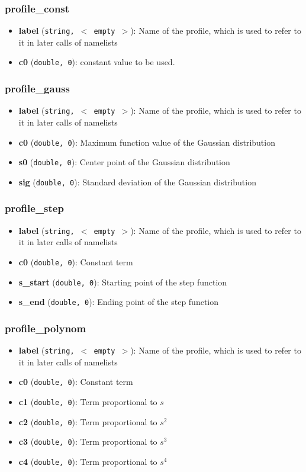 \documentclass[12pt]{book}
\begin{document}
\subsubsection{\sf profile\_const}
\begin{itemize}
\item{\bf label} ({\tt string, $<$ empty $>$}): Name of the profile, which is used to refer to it in later calls of namelists
\item{\bf c0} ({\tt double, 0}): constant value to be used.
\end{itemize}


\subsubsection{\sf profile\_gauss}
\begin{itemize}
\item{\bf label} ({\tt string, $<$ empty $>$}): Name of the profile, which is used to refer to it in later calls of namelists
\item{\bf c0} ({\tt double, 0}): Maximum function value of the Gaussian distribution
\item{\bf s0} ({\tt double, 0}): Center point of the Gaussian distribution
\item{\bf sig} ({\tt double, 0}): Standard deviation of the Gaussian distribution
\end{itemize}
\subsubsection{\sf profile\_step}
\begin{itemize}
\item{\bf label} ({\tt string, $<$ empty $>$}): Name of the profile, which is used to refer to it in later calls of namelists
\item{\bf c0} ({\tt double, 0}): Constant term
\item{\bf s\_start} ({\tt double, 0}): Starting point of the step function
\item{\bf s\_end} ({\tt double, 0}): Ending point of the step function
\end{itemize}
\subsubsection{\sf profile\_polynom}
\begin{itemize}
\item{\bf label} ({\tt string, $<$ empty $>$}): Name of the profile, which is used to refer to it in later calls of namelists
\item{\bf c0} ({\tt double, 0}): Constant term
\item{\bf c1} ({\tt double, 0}): Term proportional to $s$
\item{\bf c2} ({\tt double, 0}): Term proportional to $s^2$
\item{\bf c3} ({\tt double, 0}): Term proportional to $s^3$
\item{\bf c4} ({\tt double, 0}): Term proportional to $s^4$
\end{itemize}
\end{document}
